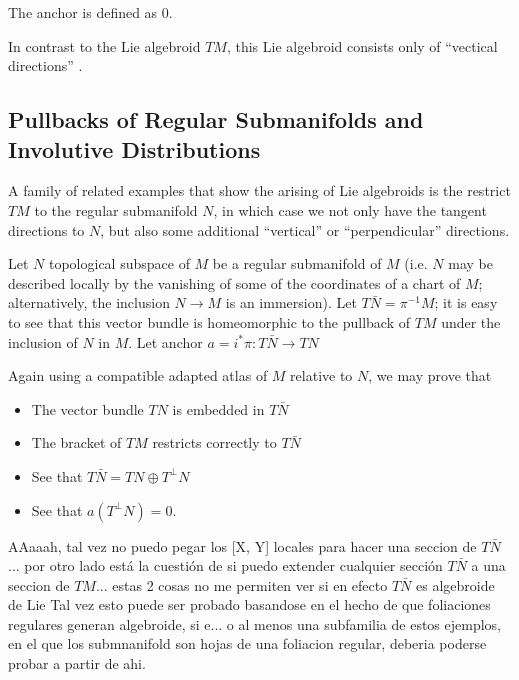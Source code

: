 The anchor is defined as $0$.

In contrast to the Lie algebroid $TM$, this Lie algebroid consists only of ``vectical directions'' .

\subsection{Pullbacks of Regular Submanifolds and Involutive Distributions}

A family of related examples that show the arising of Lie algebroids is the restrict $TM$ to the regular submanifold $N$, in which case we not only have the tangent directions to $N$, but also some additional ``vertical'' or ``perpendicular'' directions.

Let $N$ topological subspace of $M$ be a regular submanifold of $M$ (i.e. $N$ may be described locally by the vanishing of some of the coordinates of a chart of $M$; alternatively, the inclusion $N \to M$ is an immersion). Let $T\bar N = \pi^{-1} M$; it is easy to see that this vector bundle is homeomorphic to the pullback of $TM$ under the inclusion of $N$ in $M$. Let anchor $a = i^*\pi: T \bar N \to TN$ 

Again using a compatible adapted atlas of $M$ relative to $N$, we may prove that 
\begin{itemize}
\item The vector bundle $TN$ is embedded in $T \bar N$
\item The bracket of $TM$ restricts correctly to $T \bar N$
\item See that $T \bar N = TN \oplus T^\perp N$
\item See that $a(T^\perp N) = 0$.
\end{itemize}
 
AAaaah, tal vez no puedo pegar los [X, Y] locales para hacer una seccion de $T \bar N$... por otro lado está la cuestión de si puedo extender cualquier sección $T \bar N$ a una seccion de $TM$... estas 2 cosas no me permiten ver si en efecto $T \bar N$ es algebroide de Lie  Tal vez esto puede ser probado basandose en el hecho de que foliaciones regulares generan algebroide, si e... o al menos una subfamilia de estos ejemplos, en el que los submnanifold son hojas de una foliacion regular, deberia poderse probar a partir de ahi.

